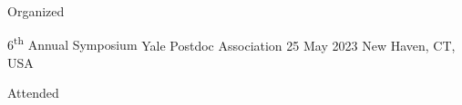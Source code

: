 


Organized

\begin{cventries}
  \cventry
    {6\textsuperscript{th} Annual Symposium} %
    {Yale Postdoc Association} %
    {25 May 2023} %
    {New Haven, CT, USA} %
    {
    }
\end{cventries}

Attended

